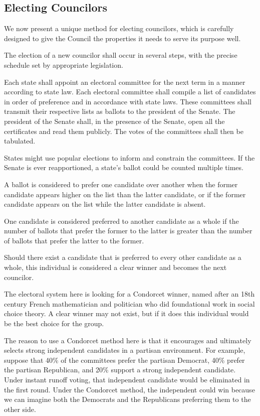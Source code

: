 \documentclass{article}
\begin{document}
\subsection{Electing Councilors}

We now present a unique method for electing councilors, which is carefully designed to give the Council the properties it needs to serve its purpose well.

\begin{quoting}
The election of a new councilor shall occur in several steps, with the precise schedule set by appropriate legislation.

Each state shall appoint an electoral committee for the next term in a manner according to state law. Each electoral committee shall compile a list of candidates in order of preference and in accordance with state laws. These committees shall transmit their respective lists as ballots to the president of the Senate.  The president of the Senate shall, in the presence of the Senate, open all the certificates and read them publicly. The votes of the committees shall then be tabulated.
\end{quoting}

States might use popular elections to inform and constrain the committees. If the Senate is ever reapportioned, a state's ballot could be counted multiple times.

\begin{quoting}
A ballot is considered to prefer one candidate over another when the former candidate appears higher on the list than the latter candidate, or if the former candidate appears on the list while the latter candidate is absent.

One candidate is considered preferred to another candidate as a whole if the number of ballots that prefer the former to the latter is greater than the number of ballots that prefer the latter to the former.

Should there exist a candidate that is preferred to every other candidate as a whole, this individual is considered a clear winner and becomes the next councilor.
\end{quoting}

The electoral system here is looking for a Condorcet winner, named after an 18th century French mathematician and politician who did foundational work in social choice theory. A clear  winner may not exist, but if it does this individual would be the best choice for the group.

The reason to use a Condorcet method here is that it encourages and ultimately selects strong independent candidates in a partisan environment. For example, suppose that 40\% of the committees prefer the partisan Democrat, 40\% prefer the partisan Republican, and 20\% support a strong independent candidate. Under instant runoff voting, that independent candidate would be eliminated in the first round. Under the Condorcet method, the independent could win because we can imagine both the Democrats and the Republicans preferring them to the other side.
\end{document}
